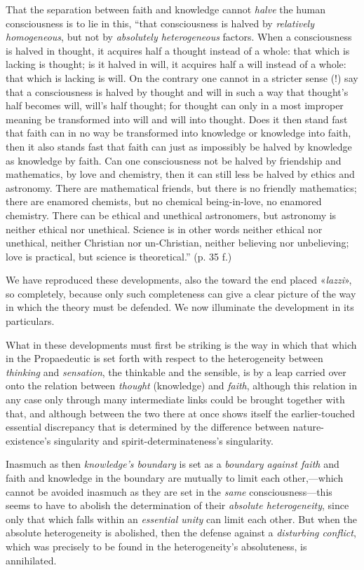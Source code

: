 \documentclass[12pt,a4paper]{book}
\begin{document}
That the separation between faith and knowledge cannot \emph{halve} the human consciousness is to lie in this,
``that consciousness is halved by \emph{relatively homogeneous}, but not by \emph{absolutely
heterogeneous} factors. When a consciousness is halved in thought, it acquires half a thought instead of
a whole: that which is lacking is thought; is it halved in will, it acquires half a will instead of a
whole: that which is lacking is will. On the contrary one cannot in a stricter sense (!) say that a
consciousness is halved by thought and will in such a way that thought's half becomes will, will's half
thought; for thought can only in a most improper meaning be transformed into will and will into thought.
Does it then stand fast that faith can in no way be transformed into knowledge or knowledge into faith,
then it also stands fast that faith can just as impossibly be halved by knowledge as knowledge by faith.
Can one consciousness not be halved by friendship and mathematics, by love and chemistry, then it can
still less be halved by ethics and astronomy. There are mathematical friends, but there is no friendly
mathematics; there are enamored chemists, but no chemical being-in-love, no enamored chemistry. There can
be ethical and unethical astronomers, but astronomy is neither ethical nor unethical. Science is in other
words neither ethical nor unethical, neither Christian nor un-Christian, neither believing nor unbelieving;
love is practical, but science is theoretical.'' (p. 35 f.)

We have reproduced these developments, also the toward the end placed «\textit{lazzi}», so completely, because only
such completeness can give a clear picture of the way in which the theory must be defended. We now
illuminate the development in its particulars.

What in these developments must first be striking is the way in which that which in the Propaedeutic is
set forth with respect to the heterogeneity between \emph{thinking} and \emph{sensation}, the thinkable
and the sensible, is by a leap carried over onto the relation between \emph{thought} (knowledge)
and \emph{faith}, although this relation in any case only through many intermediate links could be brought
together with that, and although between the two there at once shows itself the earlier-touched essential
discrepancy that is determined by the difference between nature-existence's singularity and
spirit-determinateness's singularity.

Inasmuch as then \emph{knowledge's boundary} is set as a \emph{boundary against faith} and faith and
knowledge in the boundary are mutually to limit each other,---which cannot be avoided inasmuch as they are
set in the \emph{same} consciousness---this seems to have to abolish the determination of their \emph{absolute
heterogeneity}, since only that which falls within an \emph{essential unity} can limit each other. But when the
absolute heterogeneity is abolished, then the defense against a \emph{disturbing conflict}, which was precisely to
be found in the heterogeneity's absoluteness, is annihilated.
\end{document}
